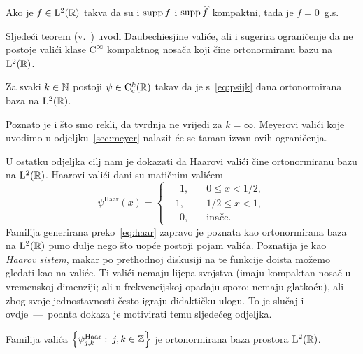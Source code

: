 \documentclass[main.tex]{subfiles}
\newcommand{\mr}[1]{\mathrm{#1}}
\begin{document}
\begin{teorem}\label{tm:neodredjenosti}
	Ako je \( f \in \mathrm{L}^2(\mathbb{R}) \) takva da su i \( \operatorname{supp} f \)
	i \( \operatorname{supp} \widehat{f} \) kompaktni, tada je \( f=0 \)~g.s.
\end{teorem}
Sljedeći teorem (v.~\cite{daub2}) uvodi Daubechiesjine valiće, ali i sugerira ograničenje
da ne postoje valići klase \( \mr C^\infty \) kompaktnog nosača
koji čine ortonormiranu bazu na \( \mathrm{L}^2(\mathbb{R}) \).
\begin{teorem}\label{tm:daub}
	Za svaki \( k \in \mathbb{N} \) postoji \( \psi \in \mr C_\mrc ^k(\R) \)
	takav da je s~\eqref{eq:psijk} dana
	ortonormirana baza na \( \mathrm{L}^2(\mathbb{R}) \).
\end{teorem}
Poznato je i što smo rekli, da tvrdnja ne vrijedi za \( k = \infty \).
Meyerovi valići koje uvodimo u odjeljku~\ref{sec:meyer}
nalazit će se taman izvan ovih ograničenja.

\bigskip
\newcommand{\psh}{\psi^{\mathrm{Haar}}}
U ostatku odjeljka cilj nam je dokazati da Haarovi valići čine ortonormiranu bazu
na \( \mathrm{L}^2(\mathbb{R}) \). Haarovi valići dani su matičnim valićem
\begin{equation}\label{eq:haar}
	\psi^{\mathrm{Haar}}(x) = \begin{cases}
		\phantom{-} 1, & \quad  0 \le x < 1/2, \\
		-1,            & \quad  1/2 \le x < 1, \\
		\phantom{-} 0, & \quad  \text{inače}.
	\end{cases}
\end{equation}
Familija generirana preko~\eqref{eq:haar} zapravo je poznata
kao ortonormirana baza na \( \mathrm{L}^2(\mathbb{R}) \) puno dulje nego što uopće postoji pojam valića.
Poznatija je kao \emph{Haarov sistem}, makar po prethodnoj diskusiji na te funkcije
doista možemo gledati kao na valiće. Ti valići nemaju lijepa svojstva (imaju
kompaktan nosač u vremenskoj dimenziji; ali u frekvencijskoj opadaju sporo;
nemaju glatkoću), ali zbog svoje jednostavnosti često igraju didaktičku ulogu.
To je slučaj i ovdje~---~poanta dokaza je motivirati temu sljedećeg odjeljka.

\begin{teorem}\label{tm:haar}
	Familija valića \( \left\{ \psh_{j,k} \st j,k \in \Z \right\} \)
	je ortonormirana baza prostora \( \mathrm{L}^2(\mathbb{R}) \).
\end{teorem}
\end{document}
